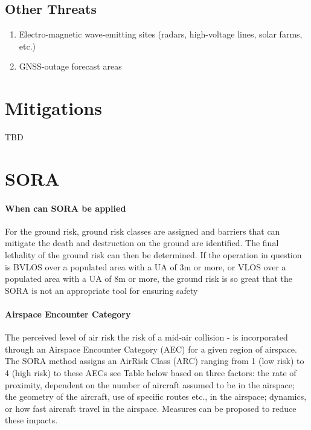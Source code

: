 \documentclass{ua_wgs_base}
\begin{document}
\subsection{Other Threats}
\begin{enumerate}
\item Electro-magnetic wave-emitting sites (radars, high-voltage lines,
solar farms, etc.) 
\item GNSS-outage forecast areas
\end{enumerate}

\section{Mitigations}

TBD

\section{SORA}

\paragraph{When can SORA be applied}

For the ground risk, ground risk classes are assigned and barriers
that can mitigate the death and destruction on the ground are identified.
The final lethality of the ground risk can then be determined. If
the operation in question is BVLOS over a populated area with a UA
of 3m or more, or VLOS over a populated area with a UA of 8m or more,
the ground risk is so great that the SORA is not an appropriate tool
for ensuring safety

\paragraph{Airspace Encounter Category}

The perceived level of air risk \textendash{} the risk of a mid-air
collision - is incorporated through an Airspace Encounter Category
(AEC) for a given region of airspace. The SORA method assigns an AirRisk
Class (ARC) ranging from 1 (low risk) to 4 (high risk) to these AECs
\textendash{} see Table below \textendash{} based on three factors:
the rate of proximity, dependent on the number of aircraft assumed
to be in the airspace; the geometry of the aircraft, use of specific
routes etc., in the airspace; dynamics, or how fast aircraft travel
in the airspace. Measures can be proposed to reduce these impacts.
\end{document}
